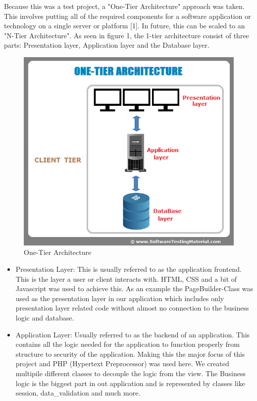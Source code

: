 \documentclass[12pt,a4paper]{article}
\begin{document}
\begin{flushleft}
	Because this was a test project, a "One-Tier Architecture" approach was taken. This involves putting all of the required components for a software application or technology on a single server or platform [1]. In future, this can be scaled to an "N-Tier Architecture".  As seen in figure 1, the 1-tier architecture consist of three parts: Presentation layer, Application layer and the Database layer.    
	\begin{figure}[h]
			\begin{center}
				\includegraphics[scale = 0.3]{one-tier-software-architecture}
			
			\caption{One-Tier Architecture}
			
			\end{center}
		\end{figure}
		
	\begin{itemize}
		\item 	Presentation Layer: This is usually referred to as the application frontend. This is the layer a user or client interacts with. HTML, CSS and a bit of Javascript was used to achieve this. As an example the PageBuilder-Class was used as the presentation layer in our application which includes only presentation layer related code without almost no connection to the business logic and database.
		
		\item Application Layer: Usually referred to as the backend of an application. This contains all the logic needed for the application to function properly from structure to security of the application. Making this the major focus of this project and PHP (Hypertext Preprocessor) was used here.  We created multipile different classes to decouple the logic from the view.  The Business logic is the biggest part in out application and is represented by classes like session, data_validation and much more.
		

\end{itemize}
\end{flushleft}
\end{document}
